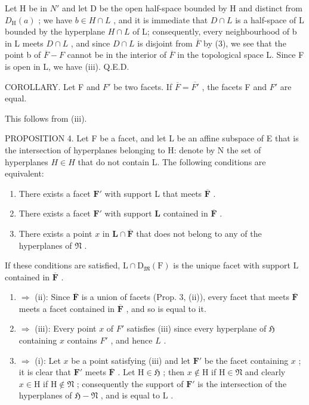 Let H be in \(N'\) and let D be the open half-space bounded by H and distinct from \(D_{\mathrm{H}}(a)\) ; we have \(b \in H \cap L\) , and it is immediate that \(D \cap L\) is a half-space of L bounded by the hyperplane \(H \cap L\) of L; consequently, every neighbourhood of b in L meets \(D \cap L\) , and since \(D \cap L\) is disjoint from \(\overline{F}\) by (3), we see that the point b of \(\overline{F} - F\) cannot be in the interior of \(\overline{F}\) in the topological space L. Since F is open in L, we have (iii). Q.E.D.

COROLLARY. Let F and \(F'\) be two facets. If \(\overline{F} = \overline{F'}\) , the facets F and \(F'\) are equal.

This follows from (iii).

PROPOSITION 4. Let F be a facet, and let L be an affine subspace of E that is the intersection of hyperplanes belonging to H: denote by N the set of hyperplanes \(H \in H\) that do not contain L. The following conditions are equivalent:

\begin{enumerate}
\def\labelenumi{(\roman{enumi})}
\item
  There exists a facet \(\mathbf{F}'\) with support L that meets \(\overline{\mathbf{F}}\) .
\item
  There exists a facet \(\mathbf{F}'\) with support \(\mathbf{L}\) contained in \(\overline{\mathbf{F}}\) .
\item
  There exists a point \(x\) in \(\mathbf{L} \cap \overline{\mathbf{F}}\) that does not belong to any of the hyperplanes of \(\mathfrak{N}\) .
\end{enumerate}

If these conditions are satisfied, \(\mathrm{L} \cap \mathrm{D}_{\mathfrak{M}}(\mathrm{F})\) is the unique facet with support \(\mathrm{L}\) contained in \(\overline{\mathbf{F}}\) .

\begin{enumerate}
\def\labelenumi{(\roman{enumi})}
\item
  \(\Longrightarrow\) (ii): Since \(\overline{\mathbf{F}}\) is a union of facets (Prop. 3, (ii)), every facet that meets \(\overline{\mathbf{F}}\) meets a facet contained in \(\overline{\mathbf{F}}\) , and so is equal to it.
\item
  \(\Longrightarrow\) (iii): Every point \(x\) of \(F'\) satisfies (iii) since every hyperplane of \(\mathfrak{H}\) containing \(x\) contains \(F'\) , and hence \(L\) .
\item
  \(\Longrightarrow\) (i): Let \(x\) be a point satisfying (iii) and let \(\mathbf{F}'\) be the facet containing \(x\) ; it is clear that \(\mathbf{F}'\) meets \(\overline{\mathbf{F}}\) . Let \(\mathrm{H} \in \mathfrak{H}\) ; then \(x \notin \mathrm{H}\) if \(\mathrm{H} \in \mathfrak{N}\) and clearly \(x \in \mathrm{H}\) if \(\mathrm{H} \notin \mathfrak{N}\) ; consequently the support of \(\mathbf{F}'\) is the intersection of the hyperplanes of \(\mathfrak{H} - \mathfrak{N}\) , and is equal to \(\mathrm{L}\) .
\end{enumerate}

